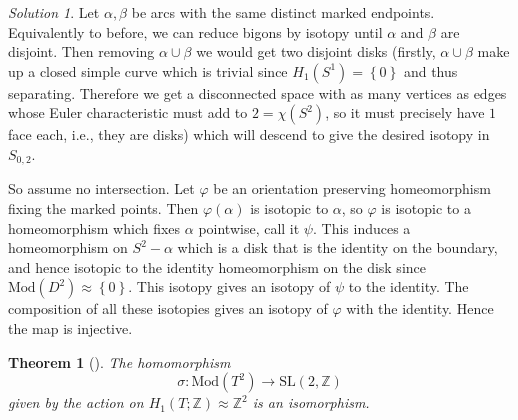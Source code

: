 \documentclass[reqno]{amsart}
\newtheorem{theorem}{Theorem}[section]
\theoremstyle{definition}
\theoremstyle{remark}
\newtheorem*{solution}{Solution}
\newcommand{\SL}{{\mathrm{SL}}}
\newcommand{\Mod}{{\mathrm{Mod}}}
\begin{document}
\begin{solution}
    Let $\alpha, \beta$ be arcs with the same distinct
    marked endpoints. Equivalently to before, we can reduce
    bigons by isotopy until $\alpha$ and $\beta$ are disjoint.
    Then removing $\alpha \cup  \beta$ we would get
    two disjoint disks (firstly, $\alpha \cup \beta$ 
    make up a closed simple curve which is trivial since
    $H_1 \left( S^{1} \right) = \left\{ 0 \right\} $ and
    thus separating. Therefore we get a disconnected
    space with as many vertices as edges whose
    Euler characteristic must add to
    $2 = \chi \left( S^{2} \right) $, so
    it must precisely have $1$ face each, i.e., they are disks)
    which will descend to give the desired
    isotopy in $S_{0,2}$.
    
    So assume no intersection. Let $\varphi$ be an orientation
    preserving homeomorphism fixing the marked points. Then
     $\varphi \left( \alpha \right) $ is isotopic
     to $\alpha$, so $\varphi$ is isotopic to a homeomorphism which
     fixes $\alpha$ pointwise, call it $\psi$.
     This induces a homeomorphism on $S^{2} - \alpha$ which
     is a disk that is the identity on the boundary, and hence
     isotopic to the identity homeomorphism on the disk
     since $\Mod \left( D^2 \right) \approx \left\{ 0 \right\} $.
     This isotopy gives an isotopy of $ \psi$ to the identity.
     The composition of all these
     isotopies gives an isotopy of 
     $\varphi$ with the identity.
     Hence the map is injective.
\end{solution}



\begin{theorem}[]\label{mcg-of-torus}
    The homomorphism
    \[
    \sigma \colon \Mod \left( T^2 \right) \to 
    \SL \left( 2, \mathbb{Z} \right) 
    \] 
    given by the action on $H_1 \left( T ;\mathbb{Z} \right) 
    \approx \mathbb{Z}^2$ is an isomorphism.
\end{theorem}
\end{document}
